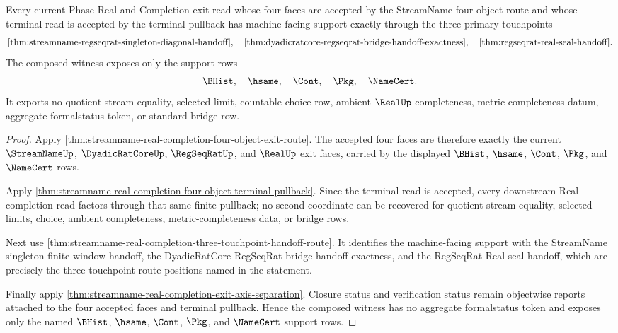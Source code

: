 \begin{theorem}
\label{thm:streamname-real-completion-four-face-lean-witness-composition}
Every current Phase Real and Completion exit read whose four faces are accepted by the StreamName four-object route and whose terminal read is accepted by the terminal pullback has machine-facing support exactly through the three primary touchpoints
$$
\autoref{thm:streamname-regseqrat-singleton-diagonal-handoff},\quad
\autoref{thm:dyadicratcore-regseqrat-bridge-handoff-exactness},\quad
\autoref{thm:regseqrat-real-seal-handoff}.
$$
The composed witness exposes only the support rows
$$
\BHist,\quad \hsame,\quad \Cont,\quad \Pkg,\quad \NameCert.
$$
It exports no quotient stream equality, selected limit, countable-choice row, ambient $\RealUp$ completeness, metric-completeness datum, aggregate formalstatus token, or standard bridge row.
\end{theorem}
\begin{proof}
Apply \autoref{thm:streamname-real-completion-four-object-exit-route}. The accepted four faces are therefore exactly the current $\StreamNameUp$, $\DyadicRatCoreUp$, $\RegSeqRatUp$, and $\RealUp$ exit faces, carried by the displayed $\BHist$, $\hsame$, $\Cont$, $\Pkg$, and $\NameCert$ rows.

Apply \autoref{thm:streamname-real-completion-four-object-terminal-pullback}. Since the terminal read is accepted, every downstream Real-completion read factors through that same finite pullback; no second coordinate can be recovered for quotient stream equality, selected limits, choice, ambient completeness, metric-completeness data, or bridge rows.

Next use \autoref{thm:streamname-real-completion-three-touchpoint-handoff-route}. It identifies the machine-facing support with the StreamName singleton finite-window handoff, the DyadicRatCore RegSeqRat bridge handoff exactness, and the RegSeqRat Real seal handoff, which are precisely the three touchpoint route positions named in the statement.

Finally apply \autoref{thm:streamname-real-completion-exit-axis-separation}. Closure status and verification status remain objectwise reports attached to the four accepted faces and terminal pullback. Hence the composed witness has no aggregate formalstatus token and exposes only the named $\BHist$, $\hsame$, $\Cont$, $\Pkg$, and $\NameCert$ support rows.
\end{proof}

